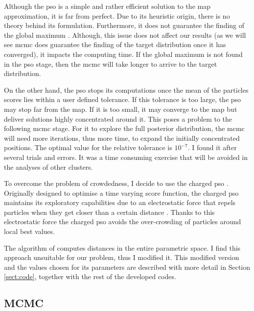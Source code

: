 Although the \gls{pso} is a simple and rather efficient solution to the \gls{map} approximation, it is far from perfect. Due to its heuristic origin, there is no theory behind its formulation. Furthermore, it does not guarantee the finding of the global maximum \cite[for a convergence guaranteed version see][]{Patel2013}. Although,  this issue does not affect our results (as we will see \gls{mcmc} does guarantee the finding of the target distribution once it has converged), it impacts the computing time. If the global maximum is not found in the \gls{pso} stage, then the \gls{mcmc} will take longer to arrive to the target distribution. 

On the other hand, the \gls{pso} stops its computations once the mean of the particles scores lies within a user defined tolerance. If this tolerance is too large, the \gls{pso} may stop far from the \gls{map}. If it is too small, it may converge to the \gls{map} but deliver solutions highly concentrated around it. This poses a problem to the following \gls{mcmc} stage. For it to explore the full posterior distribution, the \gls{mcmc} will need more iterations, thus more time, to expand the initially concentrated positions. {The optimal value for the relative tolerance is $10^{-7}$. I found it after several trials and errors. It was a time consuming exercise that will be avoided in the analyses of other clusters.} 

To overcome the problem of crowdedness, I decide to use the charged \gls{pso} \citep{Blackwell2002}. Originally designed to optimise a time varying score function, the charged \gls{pso} maintains its exploratory capabilities due to an electrostatic force that repels particles when they get closer than a certain distance \citep{Blackwell2002}. Thanks to this electrostatic force the charged \gls{pso} avoids the over-crowding of particles around local best values.

The algorithm of \citet{Blackwell2002} computes distances in the entire parametric space. I find this approach unsuitable for our problem, thus I modified it. {This modified version and the values chosen for its parameters are described with more detail in Section \ref{sect:code}, together with the rest of the developed codes. }

\subsection{MCMC}
\label{sect:MCMC}
